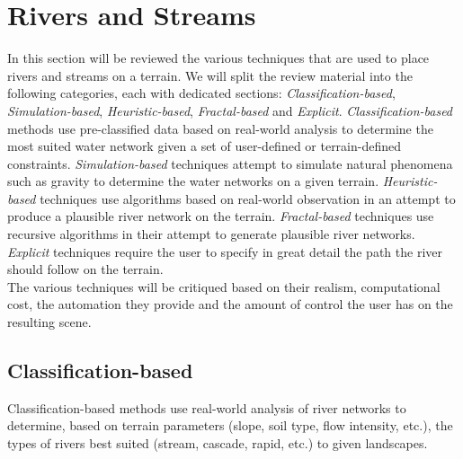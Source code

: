 \section{Rivers and Streams}

In this section will be reviewed the various techniques that are used to place rivers and streams on a terrain. We will split the review material into the following categories, each with dedicated sections: \textit{Classification-based}, \textit{Simulation-based}, \textit{Heuristic-based}, \textit{Fractal-based} and \textit{Explicit}. \textit{Classification-based} methods use pre-classified data based on real-world analysis to determine the most suited water network given a set of user-defined or terrain-defined constraints. \textit{Simulation-based} techniques attempt to simulate natural phenomena such as gravity to determine the water networks on a given terrain. \textit{Heuristic-based} techniques use algorithms based on real-world observation in an attempt to produce a plausible river network on the terrain. \textit{Fractal-based} techniques use recursive algorithms in their attempt to generate plausible river networks. \textit{Explicit} techniques require the user to specify in great detail the path the river should follow on the terrain.\\

The various techniques will be critiqued based on their realism, computational cost, the automation they provide and the amount of control the user has on the resulting scene. 

\subsection{Classification-based}

Classification-based methods use real-world analysis of river networks to determine, based on terrain parameters (slope, soil type, flow intensity, etc.), the types of rivers best suited (stream, cascade, rapid, etc.) to given landscapes.\\

